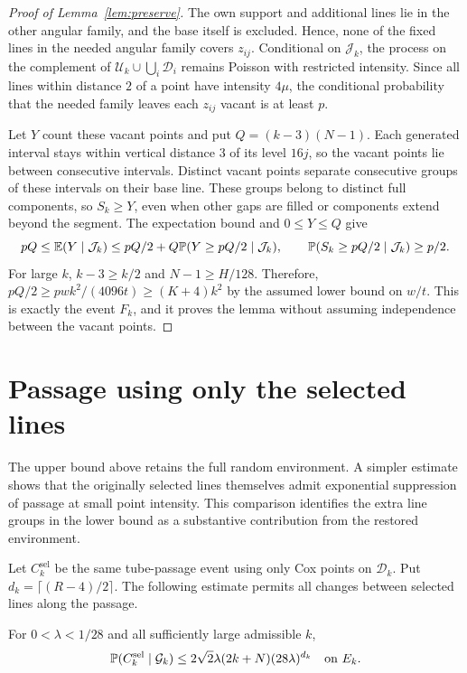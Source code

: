 \documentclass[11pt,letterpaper]{article}
\begin{document}
\begin{proof}[Proof of Lemma~\ref{lem:preserve}]
The own support and additional lines lie in the other angular family, and the base itself is excluded. Hence, none of the fixed lines in the needed angular family covers $z_{ij}$. Conditional on $\mathcal J_k$, the process on the complement of $\mathscr U_k\cup\bigcup_i\mathscr D_i$ remains Poisson with restricted intensity. Since all lines within distance $2$ of a point have intensity $4\mu$, the conditional probability that the needed family leaves each $z_{ij}$ vacant is at least $p$.

Let $Y$ count these vacant points and put $Q=(k-3)(N-1)$. Each generated interval stays within vertical distance $3$ of its level $16j$, so the vacant points lie between consecutive intervals. Distinct vacant points separate consecutive groups of these intervals on their base line. These groups belong to distinct full components, so $S_k\ge Y$, even when other gaps are filled or components extend beyond the segment. The expectation bound and $0\le Y\le Q$ give
\[
 pQ\le\E(Y\mid\mathcal J_k)
 \le pQ/2+Q\P(Y\ge pQ/2\mid\mathcal J_k),\qquad
 \P(S_k\ge pQ/2\mid\mathcal J_k)\ge p/2.
\]
For large $k$, $k-3\ge k/2$ and $N-1\ge H/128$. Therefore, $pQ/2\ge pwk^2/(4096t)\ge(K+4)k^2$ by the assumed lower bound on $w/t$. This is exactly the event $F_k$, and it proves the lemma without assuming independence between the vacant points.
\end{proof}

\section{Passage using only the selected lines}

The upper bound above retains the full random environment. A simpler estimate shows that the originally selected lines themselves admit exponential suppression of passage at small point intensity. This comparison identifies the extra line groups in the lower bound as a substantive contribution from the restored environment.

Let $C_k^{\mathrm{sel}}$ be the same tube-passage event using only Cox points on $\mathcal D_k$. Put $d_k=\lceil(R-4)/2\rceil$. The following estimate permits all changes between selected lines along the passage.

\begin{proposition}\label{prop:selected}
For $0<\lambda<1/28$ and all sufficiently large admissible $k$,
\[
 \P(C_k^{\mathrm{sel}}\mid\mathcal G_k)
 \le2\sqrt2\lambda(2k+N)(28\lambda)^{d_k}
 \quad\text{on }E_k.
\]
\end{proposition}
\end{document}
